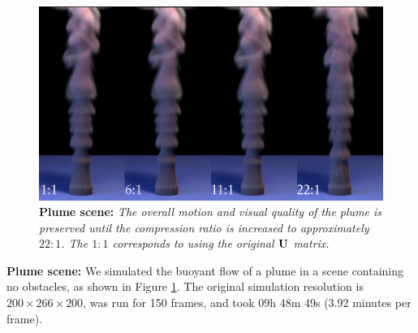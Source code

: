 
\begin{figure}[t]
\includegraphics[width=\columnwidth]{chap4/figures/plumeComparison_brighter.png}
\caption{\textbf{Plume scene:} {\em The overall motion and visual quality of the plume is preserved until the compression ratio is increased to approximately $22:1$. The $1:1$ corresponds to using the original $\mathbf{U}$ matrix.}}
\label{fig:plumeComparison}
\end{figure}

\noindent \textbf{Plume scene:} We simulated the buoyant flow of a plume in a scene containing no obstacles, as shown in Figure \ref{fig:plumeComparison}. The original simulation resolution is $200 \times 266 \times 200$, was run for 150 frames, and took 09h 48m 49s (3.92 minutes per frame).

